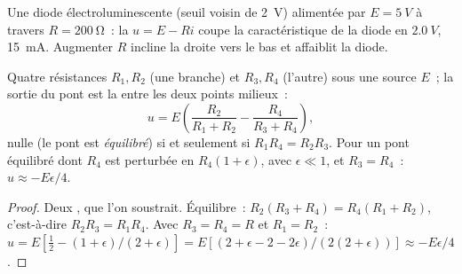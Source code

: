 \begin{omfigure}

{\small Une diode électroluminescente (seuil voisin de \qty{2}{V})
alimentée par $E = \qty{5}{V}$ à travers $R = \qty{200}{\ohm}$~: la
 $u = E - Ri$ coupe la caractéristique de la diode en
$\qty{2.0}{V}$, \qty{15}{mA}. Augmenter $R$ incline la droite vers le
bas et affaiblit la diode.}
\end{omfigure}

\begin{proposition}\label{prop:b1:dc-circuits:wheatstone}
Quatre résistances $R_1, R_2$ (une branche) et $R_3, R_4$ (l'autre) sous
une source $E$~; la sortie du pont est la  entre les deux points
milieux~:
\[
u = E\left(\frac{R_2}{R_1 + R_2} - \frac{R_4}{R_3 + R_4}\right),
\]
nulle (le pont est \emph{équilibré}) si et seulement si
$R_1R_4 = R_2R_3$. Pour un pont équilibré dont $R_4$ est perturbée en
$R_4(1 + \epsilon)$, avec $\epsilon
\ll 1$, et $R_3 = R_4$~: $u \approx -E\epsilon/4$.
\end{proposition}

\begin{proof}
Deux , que l'on soustrait. Équilibre~: $R_2(R_3 + R_4) = R_4(R_1 +
R_2)$, c'est-à-dire $R_2R_3 = R_1R_4$. Avec $R_3 = R_4 = R$ et $R_1 = R_2$~:
$u = E[\tfrac12 - (1 + \epsilon)/(2 + \epsilon)] = E[(2 + \epsilon - 2 -
2\epsilon)/(2(2 + \epsilon))] \approx -E\epsilon/4$.
\end{proof}

